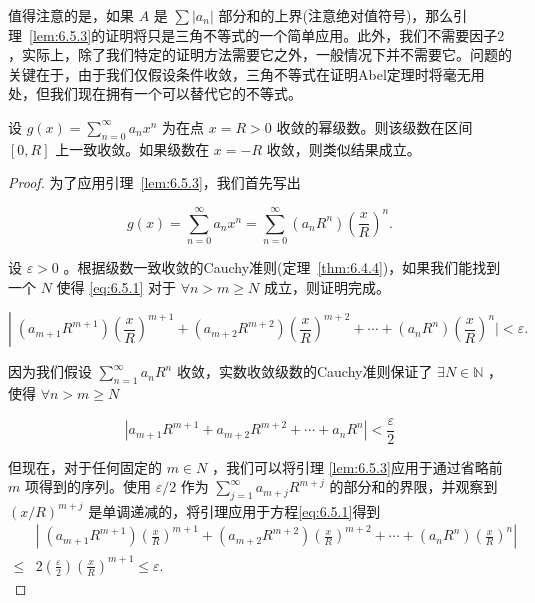 值得注意的是，如果 \(A\) 是 \(\sum \left| {a}_{n}\right|\) 部分和的上界(注意绝对值符号)，那么引理~\ref{lem:6.5.3}的证明将只是三角不等式的一个简单应用。此外，我们不需要因子$2$，实际上，除了我们特定的证明方法需要它之外，一般情况下并不需要它。问题的关键在于，由于我们仅假设条件收敛，三角不等式在证明Abel定理时将毫无用处，但我们现在拥有一个可以替代它的不等式。

\begin{Thm}[Abel定理]
  设 \(g\left( x\right)  = \mathop{\sum }\limits_{{n = 0}}^{\infty }{a}_{n}{x}^{n}\) 为在点 \(x = R > 0\) 收敛的幂级数。则该级数在区间 \(\left\lbrack  {0,R}\right\rbrack\) 上一致收敛。如果级数在 \(x =  - R\) 收敛，则类似结果成立。
\end{Thm}

\begin{proof}
  为了应用引理~\ref{lem:6.5.3}，我们首先写出

\[
g\left( x\right)  = \mathop{\sum }\limits_{{n = 0}}^{\infty }{a}_{n}{x}^{n} = \mathop{\sum }\limits_{{n = 0}}^{\infty }\left( {{a}_{n}{R}^{n}}\right) {\left( \frac{x}{R}\right) }^{n}.
\]

设 \(\varepsilon  > 0\) 。根据级数一致收敛的Cauchy准则(定理~\ref{thm:6.4.4})，如果我们能找到一个 \(N\) 使得 \eqref{eq:6.5.1} 对于 \( \forall n > m \geq  N\) 成立，则证明完成。

\begin{equation}
\label{eq:6.5.1}
\left| {\;\left( {{a}_{m + 1}{R}^{m + 1}}\right) {\left( \frac{x}{R}\right) }^{m + 1} + \left( {{a}_{m + 2}{R}^{m + 2}}\right) {\left( \frac{x}{R}\right) }^{m + 2} + \cdots }\right. + \left( {{a}_{n}{R}^{n}}\right) {\left( \frac{x}{R}\right) }^{n} \mid   < \varepsilon .
\end{equation}

因为我们假设 \(\mathop{\sum }\limits_{{n = 1}}^{\infty }{a}_{n}{R}^{n}\) 收敛，实数收敛级数的Cauchy准则保证了 \(\exists N\in \mathbb{N}\) ，使得 $\forall n > m \geq  N$

\[
\left| {{a}_{m + 1}{R}^{m + 1} + {a}_{m + 2}{R}^{m + 2} + \cdots  + {a}_{n}{R}^{n}}\right|  < \frac{\varepsilon }{2}
\]

但现在，对于任何固定的 \(m \in  N\) ，我们可以将引理 \ref{lem:6.5.3}应用于通过省略前 \(m\) 项得到的序列。使用 \(\varepsilon /2\) 作为 \(\mathop{\sum }\limits_{{j = 1}}^{\infty }{a}_{m + j}{R}^{m + j}\) 的部分和的界限，并观察到 \({\left( x/R\right) }^{m + j}\) 是单调递减的，将引理应用于方程\ref{eq:6.5.1}得到
\begin{align*}
  &\left| {\;\left( {{a}_{m + 1}{R}^{m + 1}}\right) {\left( \frac{x}{R}\right) }^{m + 1} + \left( {{a}_{m + 2}{R}^{m + 2}}\right) {\left( \frac{x}{R}\right) }^{m + 2} + \cdots }+ \left( {{a}_{n}{R}^{n}}\right) {\left( \frac{x}{R}\right) }^{n}\right|\\
 \leq&   2\left( \frac{\varepsilon }{2}\right) {\left( \frac{x}{R}\right) }^{m + 1} \leq  \varepsilon .
\end{align*}

\end{proof}

